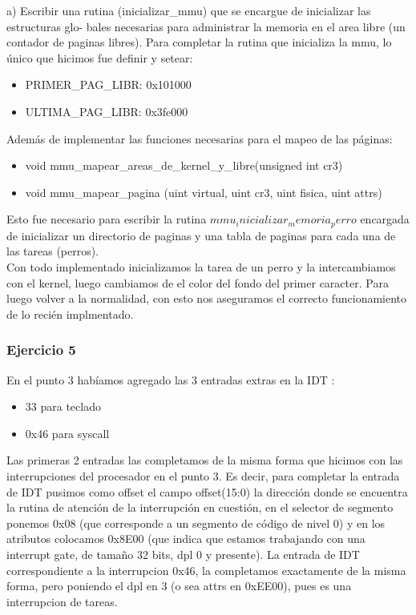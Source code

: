 a) Escribir una rutina (inicializar_mmu) que se encargue de inicializar las estructuras glo-
bales necesarias para administrar la memoria en el area libre (un contador de paginas
libres).
\indent Para completar la rutina que inicializa la mmu, lo \'unico que hicimos fue definir y setear: \\

\begin{itemize}
\item PRIMER_PAG_LIBR: 0x101000
\item ULTIMA_PAG_LIBR: 0x3fe000
\end{itemize}

Adem\'as de implementar las funciones necesarias para el mapeo de las p\'aginas:\\ 

\begin{itemize}
\itemu int mmu_proxima_pagina_fisica_libre()
\item void mmu_mapear_areas_de_kernel_y_libre(unsigned int cr3)
\item void mmu_mapear_pagina (uint virtual, uint cr3, uint fisica, uint attrs)
\end{itemize}

Esto fue necesario para escribir la rutina $mmu_inicializar_memoria_perro$ encargada de inicializar un directorio de paginas y una tabla de paginas para cada una de las tareas (perros). \\

Con todo implementado inicializamos la tarea de un perro y la intercambiamos con el kernel, luego cambiamos de el color del fondo del primer caracter. Para luego volver a la normalidad, con esto nos aseguramos el correcto funcionamiento de lo reci\'en implmentado. \\


\subsubsection{Ejercicio 5}

\indent En el punto 3 hab\'iamos agregado las 3 entradas extras en la IDT : 
\begin{itemize}
 para reloj
\item 33 para teclado
\item 0x46 para syscall
\end{itemize}

Las primeras 2 entradas las completamos de la misma forma que hicimos con las interrupciones del procesador en el punto 3. Es decir, para completar la entrada de IDT pusimos como offset el campo offset(15:0) la direcci\'on donde se encuentra la rutina de atenci\'on de la interrupci\'on en cuesti\'on, en el selector de segmento ponemos 0x08 (que corresponde a un segmento de c\'odigo de nivel 0) y en los atributos colocamos 0x8E00 (que indica que estamos trabajando con una interrupt gate, de tamaño 32 bits, dpl 0 y presente). 
La entrada de IDT correspondiente a la interrupcion 0x46, la completamos exactamente de la misma forma, pero poniendo el dpl en 3 (o sea attrs en 0xEE00), pues es una interrupcion de tareas.\\

